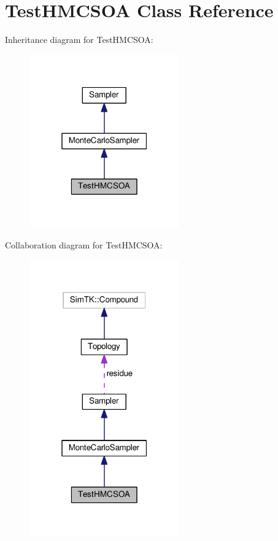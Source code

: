 \hypertarget{classTestHMCSOA}{}\section{Test\+H\+M\+C\+S\+OA Class Reference}
\label{classTestHMCSOA}


Inheritance diagram for Test\+H\+M\+C\+S\+OA\+:\nopagebreak
\begin{figure}[H]
\begin{center}
\leavevmode
\includegraphics[width=183pt]{classTestHMCSOA__inherit__graph}
\end{center}
\end{figure}


Collaboration diagram for Test\+H\+M\+C\+S\+OA\+:\nopagebreak
\begin{figure}[H]
\begin{center}
\leavevmode
\includegraphics[width=183pt]{classTestHMCSOA__coll__graph}
\end{center}
\end{figure}

